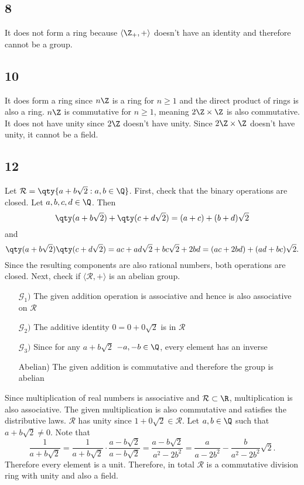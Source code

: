 \documentclass[12pt,titlepage]{extarticle}
\begin{document}

\subsection*{8}
It does not form a ring because $\langle \Z_+, + \rangle$ doesn't have an identity and therefore cannot be a group.

\subsection*{10}
It does form a ring since $n \Z$ is a ring for $n \geq 1$ and the direct product of rings is also a ring. $n \Z$ is commutative for $n \geq 1$, meaning $2 \Z \times \Z$ is also commutative. It does not have unity since $2 \Z$ doesn't have unity. Since $2 \Z \times \Z$ doesn't have unity, it cannot be a field.

\subsection*{12} %
Let $\mathcal{R} = \qty{a + b \sqrt{2} : a,b \in \Q}$. First, check that the binary operations are closed. Let $a,b,c,d \in \Q$. Then
\[
    \qty(a + b \sqrt{2}) + \qty(c + d \sqrt{2} ) = (a + c) + (b + d)\sqrt{2}
\]
and
\[
    \qty(a + b \sqrt{2}) \qty(c + d \sqrt{2} ) = ac + ad \sqrt{2} + bc \sqrt{2} + 2 bd = (ac + 2bd) + (ad + bc) \sqrt{2}
.\]
Since the resulting components are also rational numbers, both operations are closed. Next, check if $\langle \mathcal{R}, + \rangle$ is an abelian group.

\begin{enumerate}[leftmargin=2cm]
    \item[$\mathcal{G}_1)$]
        The given addition operation is associative and hence is also associative on $\mathcal{R}$
    \item[$\mathcal{G}_2)$]
        The additive identity $0 = 0 + 0 \sqrt{2}$ is in $\mathcal{R}$

    \item[$\mathcal{G}_3)$]
        Since for any $a + b \sqrt{2}$ $-a,-b \in \Q$, every element has an inverse
    \item[Abelian)]
        The given addition is commutative and therefore the group is abelian
\end{enumerate}

Since multiplication of real numbers is associative and $\mathcal{R} \subset \R$, multiplication is also associative. The given multiplication is also commutative and satisfies the distributive laws. $\mathcal{R}$ has unity since $1 + 0 \sqrt{2} \in \mathcal{R}$. Let $a,b \in \Q$ such that $a + b \sqrt{2} \neq 0$. Note that
\[
    \frac{1}{a + b \sqrt{2}} = \frac{1}{a + b \sqrt{2}} \cdot \frac{a - b \sqrt{2}}{a - b \sqrt{2}} = \frac{a - b \sqrt{2}}{a^2 - 2b^2} = \frac{a}{a - 2b^2} - \frac{b}{a^2 -2b^2} \sqrt{2}
.\]
Therefore every element is a unit. Therefore, in total $\mathcal{R}$ is a commutative division ring with unity and also a field.
\end{document}
